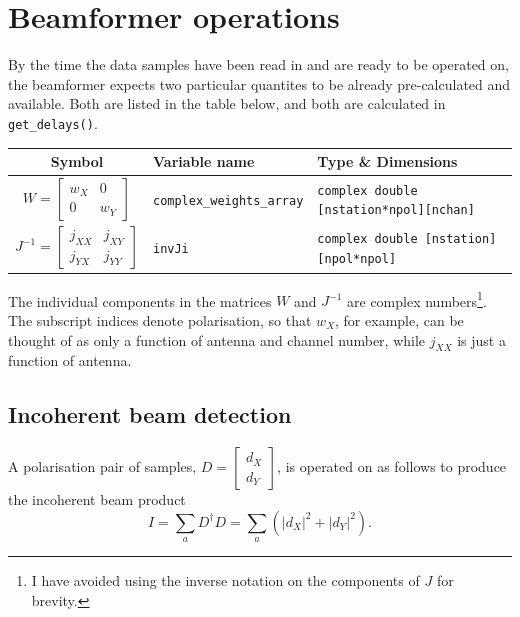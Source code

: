 \documentclass{article}
\begin{document}
\section{Beamformer operations}

By the time the data samples have been read in and are ready to be operated on, the beamformer expects two particular quantites to be already pre-calculated and available.
Both are listed in the table below, and both are calculated in \texttt{get\_delays()}.
\begin{table}[!h]
    \centering
    \begin{tabular}{c|l|l}
        Symbol & Variable name & Type \& Dimensions \\[5pt]
        \hline
        $W = \begin{bmatrix} w_X & 0 \\ 0 & w_Y \end{bmatrix}$ & \texttt{complex\_weights\_array} & \texttt{complex double [nstation*npol][nchan]} \\[12pt]
        $J^{-1} = \begin{bmatrix} j_{XX} & j_{XY} \\ j_{YX} & j_{YY} \end{bmatrix}$ & \texttt{invJi} & \texttt{complex double [nstation][npol*npol]}
    \end{tabular}
\end{table}
The individual components in the matrices $W$ and $J^{-1}$ are complex numbers\footnote{I have avoided using the inverse notation on the components of $J$ for brevity.}. The subscript indices denote polarisation, so that $w_X$, for example, can be thought of as only a function of antenna and channel number, while $j_{XX}$ is just a function of antenna.

\subsection{Incoherent beam detection}
A polarisation pair of samples, $D = \begin{bmatrix} d_X \\ d_Y \end{bmatrix}$, is operated on as follows to produce the incoherent beam product
\begin{equation}
    I = \sum_a D^\dagger D = \sum_a (|d_X|^2 + |d_Y|^2).
\end{equation}
\end{document}
